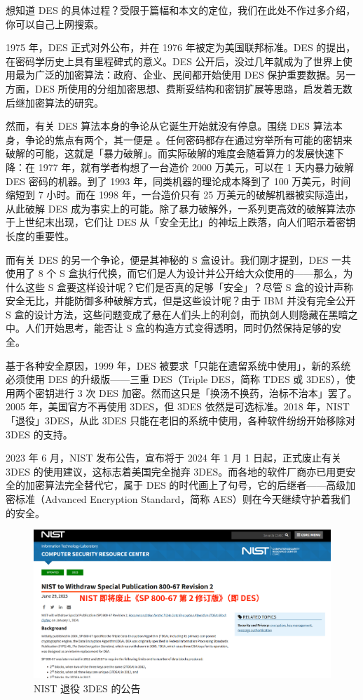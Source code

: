 \begin{note}
  想知道 DES 的具体过程？受限于篇幅和本文的定位，我们在此处不作过多介绍，你可以自己上网搜索。
\end{note}

1975 年，DES 正式对外公布，并在 1976 年被定为美国联邦标准。DES 的提出，在密码学历史上具有里程碑式的意义。DES 公开后，没过几年就成为了世界上使用最为广泛的加密算法：政府、企业、民间都开始使用 DES 保护重要数据。另一方面，DES 所使用的分组加密思想、费斯妥结构和密钥扩展等思路，启发着无数后继加密算法的研究。

然而，有关 DES 算法本身的争论从它诞生开始就没有停息。围绕 DES 算法本身，争论的焦点有两个，其一便是 。任何密码都存在通过穷举所有可能的密钥来破解的可能，这就是「暴力破解」。而实际破解的难度会随着算力的发展快速下降：在 1977 年，就有学者构想了一台造价 2000 万美元，可以在 1 天内暴力破解 DES 密码的机器。到了 1993 年，同类机器的理论成本降到了 100 万美元，时间缩短到 7 小时。而在 1998 年，一台造价只有 25 万美元的破解机器被实际造出，从此破解 DES 成为事实上的可能。除了暴力破解外，一系列更高效的破解算法亦于上世纪末出现，它们让 DES 从「安全无比」的神坛上跌落，向人们昭示着密钥长度的重要性。

而有关 DES 的另一个争论，便是其神秘的 S 盒设计。我们刚才提到，DES 一共使用了 8 个 S 盒执行代换，而它们是人为设计并公开给大众使用的——那么，为什么这些 S 盒要这样设计呢？它们是否真的足够「安全」？尽管 S 盒的设计声称安全无比，并能防御多种破解方式，但是这些设计呢？由于 IBM 并没有完全公开 S 盒的设计方法，这些问题变成了悬在人们头上的利剑，而执剑人则隐藏在黑暗之中。人们开始思考，能否让 S 盒的构造方式变得透明，同时仍然保持足够的安全。

基于各种安全原因，1999 年，DES 被要求「只能在遗留系统中使用」，新的系统必须使用 DES 的升级版——三重 DES（Triple DES，简称 TDES 或 3DES），使用两个密钥进行 3 次 DES 加密。然而这只是「换汤不换药，治标不治本」罢了。2005 年，美国官方不再使用 3DES，但 3DES 依然是可选标准。2018 年，NIST「退役」3DES，从此 3DES 只能在老旧的系统中使用，各种软件纷纷开始移除对 3DES 的支持。

2023 年 6 月，NIST 发布公告，宣布将于 2024 年 1 月 1 日起，正式废止有关 3DES 的使用建议，这标志着美国完全抛弃 3DES。而各地的软件厂商亦已用更安全的加密算法完全替代它，属于 DES 的时代画上了句号，它的后继者——高级加密标准（Advanced Encryption Standard，简称 AES）则在今天继续守护着我们的安全。

\begin{figure}[htb!]
  \centering
  \includegraphics[width=.85\textwidth]{assets/surpass/NIST_announcement.png}
  \caption{NIST 退役 3DES 的公告}
  \label{fig:NIST_announcement}
\end{figure}

